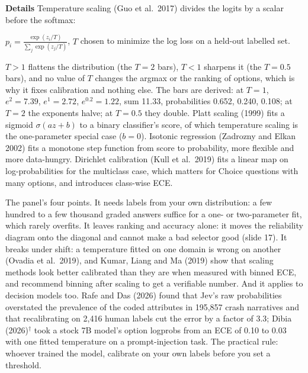 \documentclass[11pt,letterpaper]{article}
\newcommand{\para}[1]{\medskip\noindent\textbf{#1}\quad}
\newenvironment{formulas}{\begin{tcolorbox}[formulabox]}{\end{tcolorbox}}
\begin{document}
\para{Details} Temperature scaling (Guo et al.\ 2017) divides the logits by a scalar before the softmax:
\begin{formulas}
$\displaystyle p_i=\frac{\exp(z_i/T)}{\sum_j\exp(z_j/T)}$, \qquad $T$ chosen to minimize the log loss on a held-out labelled set.
\end{formulas}
$T>1$ flattens the distribution (the $T=2$ bars), $T<1$ sharpens it (the $T=0.5$ bars), and no value of $T$ changes the argmax or the ranking of options, which is why it fixes calibration and nothing else. The bars are derived: at $T=1$, $e^{2}=7.39$, $e^{1}=2.72$, $e^{0.2}=1.22$, sum 11.33, probabilities 0.652, 0.240, 0.108; at $T=2$ the exponents halve; at $T=0.5$ they double. Platt scaling (1999) fits a sigmoid $\sigma(az+b)$ to a binary classifier's score, of which temperature scaling is the one-parameter special case ($b=0$). Isotonic regression (Zadrozny and Elkan 2002) fits a monotone step function from score to probability, more flexible and more data-hungry. Dirichlet calibration (Kull et al.\ 2019) fits a linear map on log-probabilities for the multiclass case, which matters for Choice questions with many options, and introduces class-wise ECE.

The panel's four points. It needs labels from your own distribution: a few hundred to a few thousand graded answers suffice for a one- or two-parameter fit, which rarely overfits. It leaves ranking and accuracy alone: it moves the reliability diagram onto the diagonal and cannot make a bad selector good (slide 17). It breaks under shift: a temperature fitted on one domain is wrong on another (Ovadia et al.\ 2019), and Kumar, Liang and Ma (2019) show that scaling methods look better calibrated than they are when measured with binned ECE, and recommend binning after scaling to get a verifiable number. And it applies to decision models too. Rafe and Das (2026) found that Jev's raw probabilities overstated the prevalence of the coded attributes in 195,857 crash narratives and that recalibrating on 2,416 human labels cut the error by a factor of 3.3; Dibia (2026)$^\dagger$ took a stock 7B model's option logprobs from an ECE of 0.10 to 0.03 with one fitted temperature on a prompt-injection task. The practical rule: whoever trained the model, calibrate on your own labels before you set a threshold.
\end{document}
